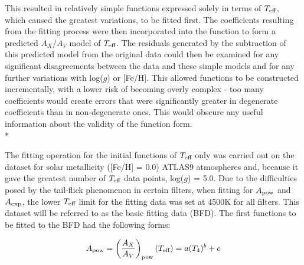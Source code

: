 \documentclass[12pt, a4paper]{report}
\begin{document}
This resulted in relatively simple functions expressed solely in terms of $T_{\textnormal{eff}}$, which caused the greatest variations, to be fitted first. The coefficients resulting from the fitting process were then incorporated into the function to form a predicted $A_{X}/A_{V}$ model of $T_{\textnormal{eff}}$. The residuals generated by the subtraction of this predicted model from the original data could then be examined for any significant disagreements between the data and these simple models and for any further variations with log($g$) or [Fe/H]. This allowed functions to be constructed incrementally, with a lower risk of becoming overly complex - too many coefficients would create errors that were significantly greater in degenerate coefficients than in non-degenerate ones. This would obscure any useful information about the validity of the function form. \\*

The fitting operation for the initial functions of $T_{\textnormal{eff}}$ only was carried out on the dataset for solar metallicity ([Fe/H] = 0.0) ATLAS9 atmospheres and, because it gave the greatest number of $T_{\textnormal{eff}}$ data points, log($g$) = 5.0. Due to the difficulties posed by the tail-flick phenomenon in certain filters, when fitting for $A_{\textnormal{pow}}$ and $A_{\textnormal{exp}}$, the lower $T_{\textnormal{eff}}$ limit for the fitting data was set at 4500K for all filters. This dataset will be referred to as the basic fitting data (BFD). The first functions to be fitted to the BFD had the following forms:

\begin{equation}
A_{\textnormal{pow}} = \left(\frac{A_{X}}{A_{V}}\right)_{\textnormal{pow}}(T_{\textnormal{eff}}) = a (T_{4})^{b} + c
\label{Teff_pow}
\end{equation}
\end{document}
